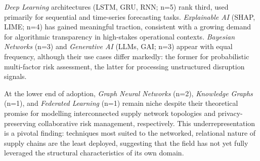\textit{Deep Learning} architectures (LSTM, GRU, RNN; n=5) rank third, used primarily for sequential and time-series forecasting tasks. \textit{Explainable AI} (SHAP, LIME; n=4) has gained meaningful traction, consistent with a growing demand for algorithmic transparency in high-stakes operational contexts. \textit{Bayesian Networks} (n=3) and \textit{Generative AI} (LLMs, GAI; n=3) appear with equal frequency, although their use cases differ markedly: the former for probabilistic multi-factor risk assessment, the latter for processing unstructured disruption signals.

At the lower end of adoption, \textit{Graph Neural Networks} (n=2), \textit{Knowledge Graphs} (n=1), and \textit{Federated Learning} (n=1) remain niche despite their theoretical promise for modelling interconnected supply network topologies and privacy-preserving collaborative risk management, respectively. This underrepresentation is a pivotal finding: techniques most suited to the networked, relational nature of supply chains are the least deployed, suggesting that the field has not yet fully leveraged the structural characteristics of its own domain.